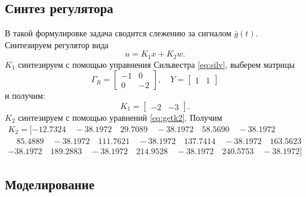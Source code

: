 \subsection{Синтез регулятора}
В такой формулировке задача сводится слежению за сигналом $\bar g(t)$.
Синтезируем регулятор вида
\begin{equation*}
    u=K_1x+K_2w.
\end{equation*}
$K_1$ синтезируем с помощью управнения Сильвестра \eqref{eq:silv},
выберем матрицы
\begin{equation*}
    \Gamma_R=\begin{bmatrix}
        -1&	0\\
        0&	-2
    \end{bmatrix},\quad
    Y=\begin{bmatrix}
        1& 1
    \end{bmatrix}
\end{equation*}
и получим:
\begin{equation*}
    K_1=\begin{bmatrix}
        -2&-3
    \end{bmatrix}.
\end{equation*}
$K_2$ синтезируем с помощью уравнений \eqref{eq:getk2}. Получим
\begin{multline*}
    K_2=[
        -12.7324 \quad -38.1972 \quad 29.7089 \quad -38.1972 \quad 58.5690 \quad -38.1972\\ \quad 85.4889 \quad 
        -38.1972 \quad 111.7621 \quad -38.1972 \quad 137.7414 \quad -38.1972 \quad 163.5623 \quad \\-38.1972 \quad 
        189.2883 \quad -38.1972 \quad 214.9528 \quad -38.1972 \quad 240.5753 \quad -38.1972]
\end{multline*}


\subsection{Моделирование}

